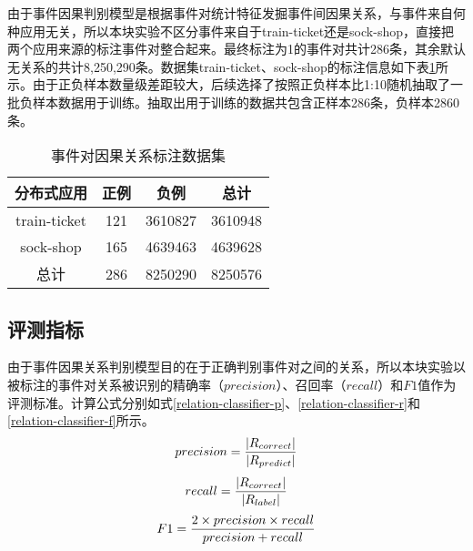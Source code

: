 由于事件因果判别模型是根据事件对统计特征发掘事件间因果关系，与事件来自何种应用无关，所以本块实验不区分事件来自于train-ticket还是sock-shop，直接把两个应用来源的标注事件对整合起来。最终标注为1的事件对共计286条，其余默认无关系的共计8,250,290‬条。数据集train-ticket、sock-shop的标注信息如下表\ref{event-cause-label}所示。由于正负样本数量级差距较大，后续选择了按照正负样本比1:10随机抽取了一批负样本数据用于训练。抽取出用于训练的数据共包含正样本286条，负样本2860条。
\begin{table}[htbp]
    \caption{事件对因果关系标注数据集}
    \centering
    \label{event-cause-label}
    \begin{tabular}{cccc}
    \toprule[2pt]
        分布式应用     & 正例  & 负例      & 总计      \\ \midrule[2pt]
    train-ticket & 121 & 3610827 & 3610948 \\
    sock-shop    & 165 & 4639463 & 4639628 \\ \midrule[1pt]
    总计           & 286 & 8250290 & 8250576 \\ 
    \bottomrule[2pt]
    \end{tabular}
\end{table}

\subsection{评测指标}
由于事件因果关系判别模型目的在于正确判别事件对之间的关系，所以本块实验以被标注的事件对关系被识别的精确率（$precision$）、召回率（$recall$）和$F1$值作为评测标准。计算公式分别如式\ref{relation-classifier-p}、\ref{relation-classifier-r}和\ref{relation-classifier-f}所示。
\begin{equation}
    \centering
    precision =\frac{\left|R_{correct }\right|}{|R_{predict}|}
    \label{relation-classifier-p}
\end{equation}
\begin{equation}
    \centering
    recall =\frac{\left|R_{correct }\right|}{\left|R_{label }\right|}
    \label{relation-classifier-r}
\end{equation}
\begin{equation}
    \centering
    F 1=\frac{2 \times  precision  \times  recall }{precision + recall }
    \label{relation-classifier-f}
\end{equation}

